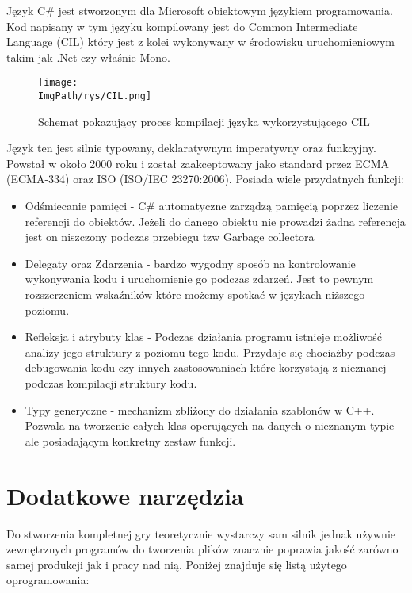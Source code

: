 \documentclass[a4paper,12pt,twoside,openany]{report}
\newcommand{\ImgPath}{.}
\begin{document}
Język C\# jest stworzonym dla Microsoft obiektowym językiem programowania. Kod napisany w tym języku kompilowany jest do Common Intermediate Language (CIL) który jest z kolei wykonywany w środowisku uruchomieniowym  takim jak .Net czy właśnie Mono.  


\begin{figure}[!htbp]
	\begin{center}
\centering
\texttt{[image: \\ImgPath/rys/CIL.png]}
\end{center}
	\caption{Schemat pokazujący proces kompilacji języka wykorzystującego CIL}
	\label{CIL}
\end{figure}

Język ten jest silnie typowany, deklaratywnym imperatywny oraz funkcyjny. Powstał w około 2000 roku i został zaakceptowany jako standard przez ECMA (ECMA-334) oraz ISO (ISO/IEC 23270:2006). Posiada wiele przydatnych funkcji:
\begin{itemize}
    \item Odśmiecanie pamięci - C\# automatyczne zarządzą pamięcią poprzez liczenie referencji do obiektów. Jeżeli do danego obiektu nie prowadzi żadna referencja jest on niszczony podczas przebiegu tzw Garbage collectora
    \item Delegaty oraz Zdarzenia - bardzo wygodny sposób na kontrolowanie wykonywania kodu i uruchomienie go podczas zdarzeń. Jest to pewnym rozszerzeniem wskaźników które możemy spotkać w językach niższego poziomu.
    \item Refleksja i atrybuty klas - Podczas działania programu istnieje możliwość analizy jego struktury z poziomu tego kodu. Przydaje się chociażby podczas debugowania kodu czy innych zastosowaniach które korzystają z nieznanej podczas kompilacji struktury kodu.
    \item Typy generyczne - mechanizm zbliżony do działania szablonów w C++. Pozwala na tworzenie całych klas operujących na danych o nieznanym typie ale posiadającym konkretny zestaw funkcji.
\end{itemize}

\section{Dodatkowe narzędzia}
Do stworzenia kompletnej gry teoretycznie wystarczy sam silnik jednak używnie zewnętrznych programów do tworzenia plików znacznie poprawia jakość zarówno samej produkcji jak i pracy nad nią. Poniżej znajduje się listą użytego oprogramowania:
\end{document}
